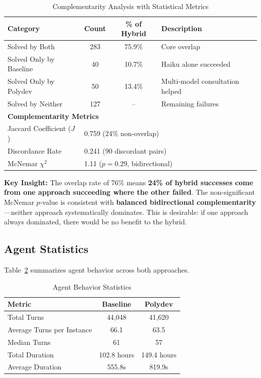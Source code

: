 \documentclass[11pt,a4paper]{article}
\begin{document}
\begin{table}[h]
\centering
\caption{Complementarity Analysis with Statistical Metrics}
\label{tab:complementarity}
\begin{tabular}{lccp{5cm}}
\toprule
\textbf{Category} & \textbf{Count} & \textbf{\% of Hybrid} & \textbf{Description} \\
\midrule
Solved by Both & 283 & 75.9\% & Core overlap \\
Solved Only by Baseline & 40 & 10.7\% & Haiku alone succeeded \\
Solved Only by Polydev & 50 & 13.4\% & Multi-model consultation helped \\
Solved by Neither & 127 & -- & Remaining failures \\
\midrule
\multicolumn{4}{l}{\textbf{Complementarity Metrics}} \\
\midrule
Jaccard Coefficient ($J$) & \multicolumn{3}{l}{0.759 (24\% non-overlap)} \\
Discordance Rate & \multicolumn{3}{l}{0.241 (90 discordant pairs)} \\
McNemar $\chi^2$ & \multicolumn{3}{l}{1.11 ($p = 0.29$, bidirectional)} \\
\bottomrule
\end{tabular}
\end{table}

\textbf{Key Insight:} The overlap rate of 76\% means \textbf{24\% of hybrid successes come from one approach succeeding where the other failed}. The non-significant McNemar $p$-value is consistent with \textbf{balanced bidirectional complementarity}---neither approach systematically dominates. This is desirable: if one approach always dominated, there would be no benefit to the hybrid.

\subsection{Agent Statistics}

Table~\ref{tab:agent_stats} summarizes agent behavior across both approaches.

\begin{table}[h]
\centering
\caption{Agent Behavior Statistics}
\label{tab:agent_stats}
\begin{tabular}{lcc}
\toprule
\textbf{Metric} & \textbf{Baseline} & \textbf{Polydev} \\
\midrule
Total Turns & 44,048 & 41,620 \\
Average Turns per Instance & 66.1 & 63.5 \\
Median Turns & 61 & 57 \\
Total Duration & 102.8 hours & 149.4 hours \\
Average Duration & 555.8s & 819.9s \\
\bottomrule
\end{tabular}
\end{table}
\end{document}
